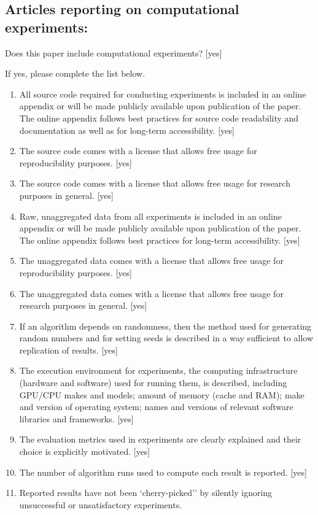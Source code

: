 \documentclass[manuscript, screen, review]{jair}
\begin{document}
\subsection*{Articles reporting on computational experiments:}
Does this paper include computational experiments? [yes]

If yes, please complete the list below.
\begin{enumerate}
    \item All source code required for conducting experiments is included in an online appendix or will be made publicly available upon publication of the paper. The online appendix follows best practices for source code readability and documentation as well as for long-term accessibility.
    [yes]
    \item The source code comes with a license that allows free usage for reproducibility purposes.
    [yes]
    \item The source code comes with a license that allows free usage for research purposes in general.
    [yes]
    \item Raw, unaggregated data from all experiments is included in an online appendix or will be made publicly available upon publication of the paper. The online appendix follows best practices for long-term accessibility.
    [yes]
    \item The unaggregated data comes with a license that allows free usage for reproducibility purposes.
    [yes]
    \item The unaggregated data comes with a license that allows free usage for research purposes in general.
    [yes]
    \item If an algorithm depends on randomness, then the method used for generating random numbers and for setting seeds is described in a way sufficient to allow replication of results. 
    [yes]
    \item The execution environment for experiments, the computing infrastructure (hardware and software) used for running them, is described, including GPU/CPU makes and models; amount of memory (cache and RAM); make and version of operating system; names and versions of relevant software libraries and frameworks. 
    [yes]
    \item The evaluation metrics used in experiments are clearly explained and their choice is explicitly motivated. 
    [yes]
    \item The number of algorithm runs used to compute each result is reported. 
    [yes]
    \item Reported results have not been `cherry-picked'' by silently ignoring unsuccessful or unsatisfactory experiments. 

\end{enumerate}
\end{document}

